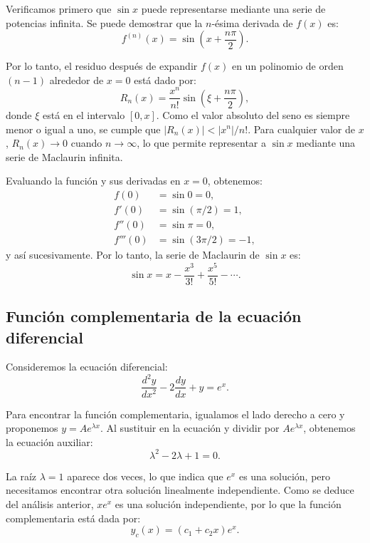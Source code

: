 \documentclass{article}
\begin{document}
Verificamos primero que $\sin x$ puede representarse mediante una serie de potencias infinita. Se puede demostrar que la $n$-ésima derivada de $f(x)$ es:
\begin{equation}
    f^{(n)}(x) = \sin \left( x + \frac{n \pi}{2} \right).
\end{equation}

Por lo tanto, el residuo después de expandir $f(x)$ en un polinomio de orden $(n-1)$ alrededor de $x=0$ está dado por:
\begin{equation}
    R_n(x) = \frac{x^n}{n!} \sin \left( \xi + \frac{n \pi}{2} \right),
\end{equation}
donde $\xi$ está en el intervalo $[0, x]$. Como el valor absoluto del seno es siempre menor o igual a uno, se cumple que $|R_n(x)| < |x^n|/n!$. Para cualquier valor de $x$, $R_n(x) \to 0$ cuando $n \to \infty$, lo que permite representar a $\sin x$ mediante una serie de Maclaurin infinita.

Evaluando la función y sus derivadas en $x=0$, obtenemos:
\begin{align*}
    f(0) &= \sin 0 = 0, \\
    f'(0) &= \sin(\pi/2) = 1, \\
    f''(0) &= \sin \pi = 0, \\
    f'''(0) &= \sin(3\pi/2) = -1,
\end{align*}
y así sucesivamente. Por lo tanto, la serie de Maclaurin de $\sin x$ es:
\begin{equation}
    \sin x = x - \frac{x^3}{3!} + \frac{x^5}{5!} - \cdots.
\end{equation}

\subsection*{Función complementaria de la ecuación diferencial}

Consideremos la ecuación diferencial:
\begin{equation}
    \frac{d^2 y}{dx^2} - 2 \frac{dy}{dx} + y = e^x.
\end{equation}

Para encontrar la función complementaria, igualamos el lado derecho a cero y proponemos $y = Ae^{\lambda x}$. Al sustituir en la ecuación y dividir por $Ae^{\lambda x}$, obtenemos la ecuación auxiliar:
\begin{equation}
    \lambda^2 - 2\lambda + 1 = 0.
\end{equation}

La raíz $\lambda = 1$ aparece dos veces, lo que indica que $e^x$ es una solución, pero necesitamos encontrar otra solución linealmente independiente. Como se deduce del análisis anterior, $xe^x$ es una solución independiente, por lo que la función complementaria está dada por:
\begin{equation}
    y_c(x) = (c_1 + c_2 x)e^x.
\end{equation}
\end{document}
